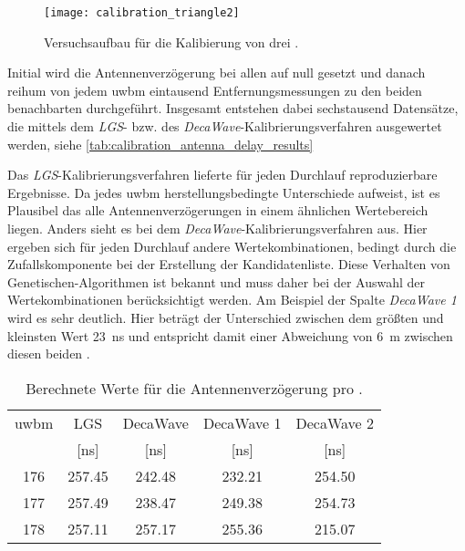 \begin{figure}
	\centering
	\texttt{[image: calibration\_triangle2]}
	\caption{Versuchsaufbau für die Kalibierung von drei .}
	\label{fig:calibration_triangle2}
\end{figure}

Initial wird die Antennenverzögerung bei allen  auf null gesetzt und danach reihum von jedem \Gls{uwbm} eintausend Entfernungsmessungen zu den beiden benachbarten  durchgeführt. Insgesamt entstehen dabei sechstausend Datensätze, die mittels dem \textit{LGS}- bzw. des \textit{DecaWave}-Kalibrierungsverfahren ausgewertet werden, siehe \autoref{tab:calibration_antenna_delay_results}

Das \textit{LGS}-Kalibrierungsverfahren lieferte für jeden Durchlauf reproduzierbare Ergebnisse. Da jedes \Gls{uwbm} herstellungsbedingte Unterschiede aufweist, ist es Plausibel das alle Antennenverzögerungen in einem ähnlichen Wertebereich liegen. Anders sieht es bei dem \textit{DecaWave}-Kalibrierungsverfahren aus. Hier ergeben sich für jeden Durchlauf andere Wertekombinationen, bedingt durch die Zufallskomponente bei der Erstellung der Kandidatenliste. Diese Verhalten von Genetischen-Algorithmen ist bekannt und muss daher bei der Auswahl der Wertekombinationen berücksichtigt werden. Am Beispiel der Spalte \textit{DecaWave 1} wird es sehr deutlich. Hier beträgt der Unterschied zwischen dem größten und kleinsten Wert \approx\SI{23}{\ns} und entspricht damit einer Abweichung von \approx\SI{6}{\meter} zwischen diesen beiden .

\begin{table}
	\centering
	\begin{tabular}{||c||c||ccc||}
\hline
\Gls{uwbm} & LGS & DecaWave & DecaWave 1 & DecaWave 2 \\
& [\si{\nano\second}] & [\si{\nano\second}] & [\si{\nano\second}] & [\si{\nano\second}] \\
\hline
\hline
176 & \num{257.45} & \num{242.48} & \num{232.21} & \num{254.50} \\
177 & \num{257.49} & \num{238.47} & \num{249.38} & \num{254.73} \\
178 & \num{257.11} & \num{257.17} & \num{255.36} & \num{215.07} \\
\hline
	\end{tabular}
	\caption{Berechnete Werte für die Antennenverzögerung pro .}
	\label{tab:calibration_antenna_delay_results}
\end{table}

